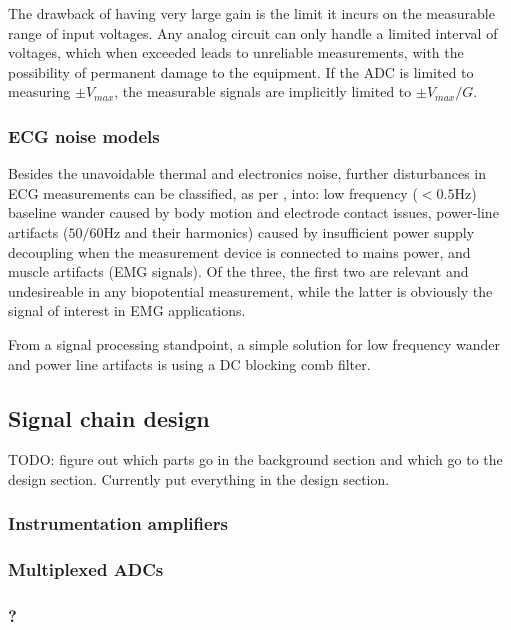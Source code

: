\documentclass{thesis}
\newcommand{\todo}[1]{{\color{red}TODO: #1}}
\newcommand{\Hz}{\unit{\hertz}}
\begin{document}
The drawback of having very large gain is the limit it incurs on the measurable range of input voltages. Any analog circuit can only handle a limited interval of voltages, which when exceeded leads to unreliable measurements, with the possibility of permanent damage to the equipment. If the ADC is limited to measuring $\pm V_{max}$, the measurable signals are implicitly limited to $\pm V_{max}/G$.

\subsubsection{ECG noise models}

Besides the unavoidable thermal and electronics noise, further disturbances in ECG measurements can be classified, as per \cite{Chatterjee2020}, into: low frequency ($< 0.5\Hz$) baseline wander caused by body motion and electrode contact issues, power-line artifacts ($50/60\Hz$ and their harmonics) caused by insufficient power supply decoupling when the measurement device is connected to mains power, and muscle artifacts (EMG signals). Of the three, the first two are relevant and undesireable in any biopotential measurement, while the latter is obviously the signal of interest in EMG applications.

From a signal processing standpoint, a simple solution for low frequency wander and power line artifacts is using a DC blocking comb filter.

\subsection{Signal chain design}

\todo{figure out which parts go in the background section and which go to the design section. Currently put everything in the design section.}

\subsubsection{Instrumentation amplifiers}

\subsubsection{Multiplexed ADCs}

\subsubsection{?}
\end{document}
